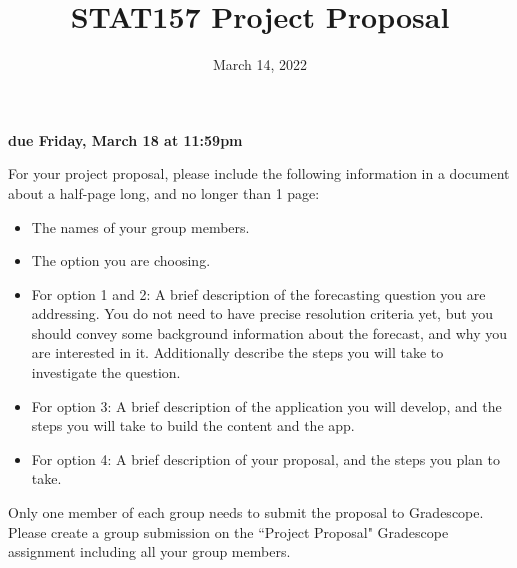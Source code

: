 \documentclass[11pt]{article}
\title{STAT157 Project Proposal}
\date{March 14, 2022}
\begin{document}
\maketitle

\hfill \textbf{due Friday, March 18 at 11:59pm}


For your project proposal, please include the following information in a document about a half-page long, and no longer than 1 page:
\begin{itemize}
	\item The names of your group members.
	\item The option you are choosing.
	\item For option 1 and 2: A brief description of the forecasting question you are addressing. You do not need to have precise resolution criteria yet, but you should convey some background information about the forecast, and why you are interested in it. Additionally describe the steps you will take to investigate the question.
	\item For option 3: A brief description of the application you will develop, and the steps you will take to build the content and the app.
	\item For option 4: A brief description of your proposal, and the steps you plan to take.
\end{itemize}

Only one member of each group needs to submit the proposal to Gradescope. Please create a group submission on the ``Project Proposal" Gradescope assignment including all your group members.
\end{document}

